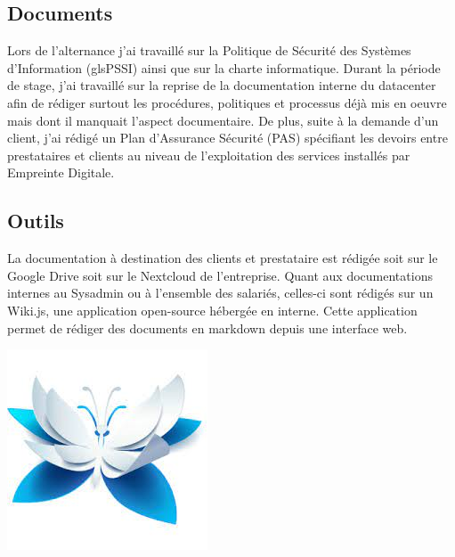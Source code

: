 \documentclass[12pt, a4paper, twoside]{article}
\begin{document}
\subsection{Documents}
Lors de l'alternance j'ai travaillé sur la Politique de Sécurité des Systèmes d'Information (gls{PSSI}) ainsi que sur la charte informatique. 
Durant la période de stage, j'ai travaillé sur la reprise de la documentation interne du datacenter afin de rédiger surtout les procédures, politiques et processus déjà mis en oeuvre mais dont il manquait l'aspect documentaire.
De plus, suite à la demande d'un client, j'ai rédigé un Plan d'Assurance Sécurité (\gls{PAS}) spécifiant les devoirs entre prestataires et clients au niveau de l'exploitation des services installés par Empreinte Digitale.

\subsection{Outils}

\noindent%
\begin{minipage}{.7\textwidth}%
La documentation à destination des clients et prestataire est rédigée soit sur le Google Drive soit sur le \gls{Nextcloud} de l'entreprise. 
Quant aux documentations internes au Sysadmin ou à l'ensemble des salariés, celles-ci sont rédigés sur un Wiki.js, une application open-source hébergée en interne. 
Cette application permet de rédiger des documents en markdown depuis une interface web.

\end{minipage}%
\hfill
\begin{minipage}{.3\textwidth}%
\begin{center}
\includegraphics[width=.6\textwidth]{src/logo_wikijs.jpeg}
\end{center}
\end{minipage}%
\end{document}
